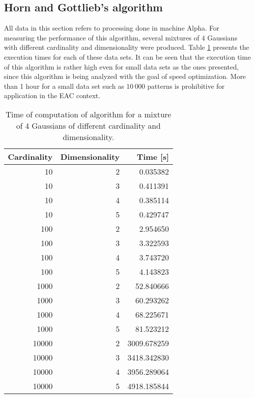 



\subsection{Horn and Gottlieb's algorithm}



All data in this section refers to processing done in machine Alpha.
For measuring the performance of this algorithm, several mixtures of 4 Gaussians with different cardinality and dimensionality were produced.
Table \ref{tab:horn performance} presents the execution times for each of these data sets.
It can be seen that the execution time of this algorithm is rather high even for small data sets as the ones presented, since this algorithm is being analyzed with the goal of speed optimization.
More than 1 hour for a small data set such as $10 \: 000$ patterns is prohibitive for application in the EAC context.

\begin{table}[h]
\centering
\caption{Time of computation of \citet{Horn2001b} algorithm for a mixture of 4 Gaussians of different cardinality and dimensionality.}

\begin{tabular}{rrr}
\toprule
 Cardinality &  Dimensionality &     Time [s] \\
\midrule
          10 &               2 &     0.035382 \\
          10 &               3 &     0.411391 \\
          10 &               4 &     0.385114 \\
          10 &               5 &     0.429747 \\
         100 &               2 &     2.954650 \\
         100 &               3 &     3.322593 \\
         100 &               4 &     3.743720 \\
         100 &               5 &     4.143823 \\
        1000 &               2 &    52.840666 \\
        1000 &               3 &    60.293262 \\
        1000 &               4 &    68.225671 \\
        1000 &               5 &    81.523212 \\
       10000 &               2 &  3009.678259 \\
       10000 &               3 &  3418.342830 \\
       10000 &               4 &  3956.289064 \\
       10000 &               5 &  4918.185844 \\
\bottomrule
\end{tabular}

\label{tab:horn performance}
\end{table}


